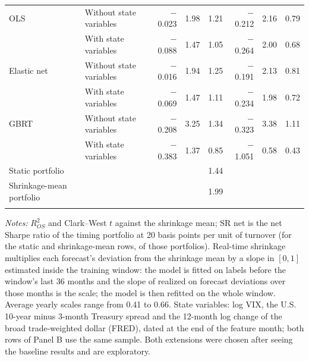 \begin{table}[!ht]
\begin{tabular}{llrrrrrr}
OLS & Without state variables & $-$0.023 & 1.98 & 1.21 & $-$0.212 & 2.16 & 0.79 \\
 & With state variables & $-$0.088 & 1.47 & 1.05 & $-$0.264 & 2.00 & 0.68 \\
Elastic net & Without state variables & $-$0.016 & 1.94 & 1.25 & $-$0.191 & 2.13 & 0.81 \\
 & With state variables & $-$0.069 & 1.47 & 1.11 & $-$0.234 & 1.98 & 0.72 \\
GBRT & Without state variables & $-$0.208 & 3.25 & 1.34 & $-$0.323 & 3.38 & 1.11 \\
 & With state variables & $-$0.383 & 1.37 & 0.85 & $-$1.051 & 0.58 & 0.43 \\
Static portfolio & & & & 1.44 & & & \\
Shrinkage-mean portfolio & & & & 1.99 & & & \\
\addlinespace
\bottomrule
\end{tabular}

\vspace{4pt}
\begin{minipage}{0.97\linewidth}\footnotesize
\textit{Notes:} $R^2_{OS}$ and Clark--West $t$ against the shrinkage mean; SR net is the net Sharpe ratio of the timing portfolio at 20 basis points per unit of turnover (for the static and shrinkage-mean rows, of those portfolios). Real-time shrinkage multiplies each forecast's deviation from the shrinkage mean by a slope in $[0,1]$ estimated inside the training window: the model is fitted on labels before the window's last 36 months and the slope of realized on forecast deviations over those months is the scale; the model is then refitted on the whole window. Average yearly scales range from 0.41 to 0.66. State variables: log VIX, the U.S. 10-year minus 3-month Treasury spread and the 12-month log change of the broad trade-weighted dollar (FRED), dated at the end of the feature month; both rows of Panel B use the same sample. Both extensions were chosen after seeing the baseline results and are exploratory.
\end{minipage}
\end{table}
